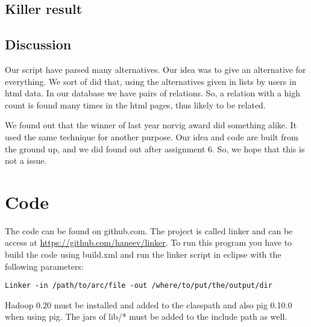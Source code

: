 \documentclass[a4paper,10pt]{article}
\begin{document}
\subsection{Killer result}

\subsection{Discussion}
Our script have parsed many alternatives. Our idea was to give an alternative for everything. We sort of did that, using the alternatives given in lists by users in html data. In our database we have pairs of relations. So, a relation with a high count is found many times in the html pages, thus likely to be related. 

We found out that the winner of last year norvig award did something alike. It used the same technique for another purpose. Our idea and code are built from the ground up, and we did found out after assignment 6. So, we hope that this is not a issue.
\appendix 

\section{Code}
The code can be found on github.com. The project is called linker and can be access at \url{https://github.com/haneev/linker}. To run this program you have to build the code using build.xml and run the linker script in eclipse with the following parameters:
\begin{lstlisting}
Linker -in /path/to/arc/file -out /where/to/put/the/output/dir
\end{lstlisting}

Hadoop 0.20 must be installed and added to the classpath and also pig 0.10.0 when using pig. The jars of lib/* must be added to the include path as well.

\lstlistoflistings
\end{document}
